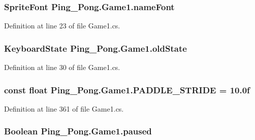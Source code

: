 \hypertarget{class_ping___pong_1_1_game1_a1f794b8a0feab9dfdbf4c98dc86222cf}{
\subsubsection[{name\-Font}]{\setlength{\rightskip}{0pt plus 5cm}Sprite\-Font Ping\-\_\-\-Pong.\-Game1.\-name\-Font\hspace{0.3cm}{\ttfamily [private]}}}\label{class_ping___pong_1_1_game1_a1f794b8a0feab9dfdbf4c98dc86222cf}


Definition at line 23 of file Game1.\-cs.

\hypertarget{class_ping___pong_1_1_game1_a13ba97510380dfbf6c00815f4d5af7ad}{
\subsubsection[{old\-State}]{\setlength{\rightskip}{0pt plus 5cm}Keyboard\-State Ping\-\_\-\-Pong.\-Game1.\-old\-State\hspace{0.3cm}{\ttfamily [private]}}}\label{class_ping___pong_1_1_game1_a13ba97510380dfbf6c00815f4d5af7ad}


Definition at line 30 of file Game1.\-cs.

\hypertarget{class_ping___pong_1_1_game1_a4613e5c643f7d89e1d4dabb2b383bfad}{
\subsubsection[{P\-A\-D\-D\-L\-E\-\_\-\-S\-T\-R\-I\-D\-E}]{\setlength{\rightskip}{0pt plus 5cm}const float Ping\-\_\-\-Pong.\-Game1.\-P\-A\-D\-D\-L\-E\-\_\-\-S\-T\-R\-I\-D\-E = 10.\-0f\hspace{0.3cm}{\ttfamily [private]}}}\label{class_ping___pong_1_1_game1_a4613e5c643f7d89e1d4dabb2b383bfad}


Definition at line 361 of file Game1.\-cs.

\hypertarget{class_ping___pong_1_1_game1_a87f945d8a88fa041a94fe15c1446173e}{
\subsubsection[{paused}]{\setlength{\rightskip}{0pt plus 5cm}Boolean Ping\-\_\-\-Pong.\-Game1.\-paused\hspace{0.3cm}{\ttfamily [private]}}}\label{class_ping___pong_1_1_game1_a87f945d8a88fa041a94fe15c1446173e}


